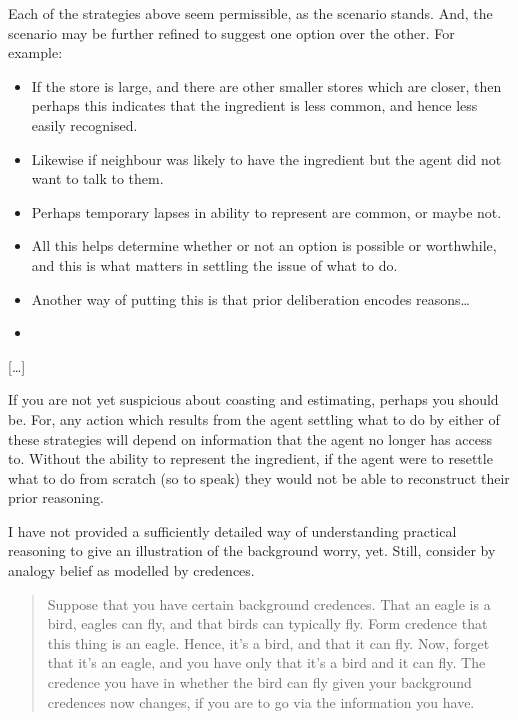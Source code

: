 \documentclass[10pt]{article}
\begin{document}
Each of the strategies above seem permissible, as the scenario stands.
And, the scenario may be further refined to suggest one option over the other.
For example:
\begin{itemize}
\item {\color{red} If the store is large, and there are other smaller stores which are closer, then perhaps this indicates that the ingredient is less common, and hence less easily recognised.}
\item {\color{red} Likewise if neighbour was likely to have the ingredient but the agent did not want to talk to them.}
\item {\color{red} Perhaps temporary lapses in ability to represent are common, or maybe not.}
\item {\color{blue} All this helps determine whether or not an option is possible or worthwhile, and this is what matters in settling the issue of what to do.}
\item {\color{red} Another way of putting this is that prior deliberation encodes reasons\dots}
\item \end{itemize}


\begin{center}
  [\dots]
\end{center}

If you are not yet suspicious about coasting and estimating, perhaps you should be.
For, any action which results from the agent settling what to do by either of these strategies will depend on information that the agent no longer has access to.
Without the ability to represent the ingredient, if the agent were to resettle what to do from scratch (so to speak) they would not be able to reconstruct their prior reasoning.

I have not provided a sufficiently detailed way of understanding practical reasoning to give an illustration of the background worry, yet.
Still, consider by analogy belief as modelled by credences.
\begin{quote}
  Suppose that you have certain background credences.
  That an eagle is a bird, eagles can fly, and that birds can typically fly.
  Form credence that this thing is an eagle.
  Hence, it's a bird, and that it can fly.
  Now, forget that it's an eagle, and you have only that it's a bird and it can fly.
  The credence you have in whether the bird can fly given your background credences now changes, if you are to go via the information you have.
\end{quote}
\end{document}
